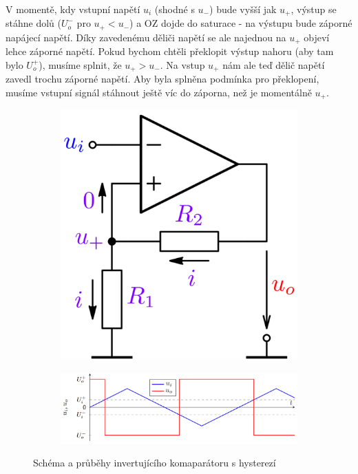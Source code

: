 \documentclass[a4paper,12pt]{article}   %
\begin{document}
V momentě, kdy vstupní napětí $u_i$ (shodné s $u_-$) bude vyšší jak $u_+$, výstup se stáhne dolů ($U_o^-$ pro $u_+ < u_-$) a OZ dojde do saturace - na výstupu bude záporné napájecí napětí. Díky zavedenému děliči napětí se ale najednou na $u_+$ objeví lehce záporné napětí. Pokud bychom chtěli překlopit výstup nahoru (aby tam bylo $U_o^+$), musíme splnit, že $u_+ > u_-$. Na vstup $u_+$ nám ale teď dělič napětí zavedl trochu záporné napětí. Aby byla splněna podmínka pro překlopení, musíme vstupní signál stáhnout ještě víc do záporna, než je momentálně $u_+$.

\begin{figure}[h!]
    \centering
    \begin{subfigure}{.3\textwidth}
        \centering
        \includegraphics[width=\textwidth]{komparator-invert.PNG}
    \end{subfigure}
    \begin{subfigure}{.65\textwidth}
        \centering
        \includegraphics[width=\textwidth]{komparator-invert-graf.PNG}
    \end{subfigure}
    \caption{Schéma a průběhy invertujícího komaparátoru s hysterezí}
    \label{fig:invert:komp}
\end{figure}
\end{document}

